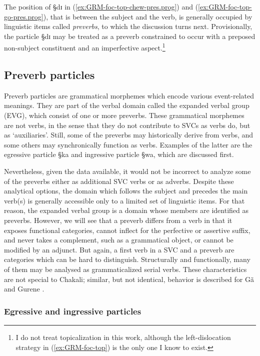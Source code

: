 The position of {\S dɪ} in  (\ref{ex:GRM-foc-top-chew-pres.prog}) and 
 (\ref{ex:GRM-foc-top-go-pres.prog}), that is between the subject and the verb,
is generally occupied by linguistic items called  {\it preverbs},  to which the
discussion turns next.  Provisionally, the particle {\S dɪ} may be treated as a
preverb constrained to occur with  a preposed  non-subject constituent and
an imperfective aspect.\footnote{I do not treat topicalization in this work,
although the left-dislocation strategy in (\ref{ex:GRM-foc-top}) is the only
one I know to exist.}

\subsection{Preverb particles}
\label{sec:GRM-precerv}

Preverb particles are grammatical morphemes which encode various event-related
meanings. They are part of the verbal domain  called the expanded verbal group
(EVG), which  consist of  one or more preverbs.  These grammatical morphemes are
not verbs, in the sense that they do not contribute to SVCs as verbs do,  but as
`auxiliaries'. Still,  some of the preverbs may historically derive from verbs, 
and  some others may synchronically function as verbs.  Examples of the latter
are the egressive particle {\S ka} and ingressive particle {\S wa},  which are
discussed first. 


Nevertheless, given the data available,  it would not be incorrect to analyze
some of the preverbs  either as additional SVC verbs or as adverbs. Despite
these analytical options, the domain which follows the subject and precedes the
main verb(s) is generally accessible  only to a limited set of linguistic items.
For that reason, the expanded verbal group is a domain whose members are
identified as preverbs. However, we will see  that a preverb differs from a verb
in that it exposes functional categories,  cannot inflect for the perfective or
assertive suffix,  and never takes  a complement, such as a grammatical object,
or cannot be modified by  an adjunct. But again,  a first verb in a
SVC
and a preverb are categories which can be hard to distinguish. Structurally and
functionally, many of them may be analysed as grammaticalized serial verbs.
These characteristics are not special to Chakali; similar, but not identical,
behavior is described for Gã and Gurene \citep{Daku07b, Daku08}.



\subsubsection{Egressive and ingressive particles}
\label{sec:GRM-EVC-egr-ingr}


